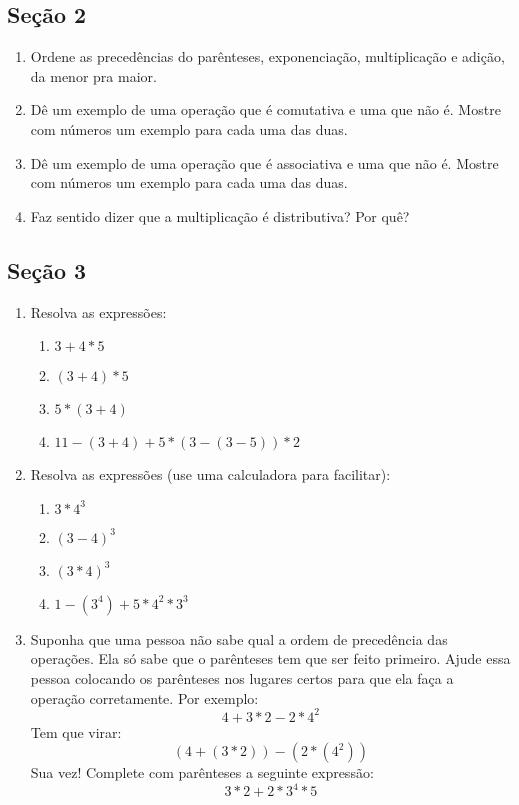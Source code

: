 \documentclass[12pt]{article}
\begin{document}
\subsection{Seção 2}
\begin{enumerate}
	\item Ordene as precedências do parênteses, exponenciação, multiplicação e 
adição, da menor pra maior.
	\item Dê um exemplo de uma operação que é comutativa e uma que não é. Mostre
com números um exemplo para cada uma das duas.
	\item Dê um exemplo de uma operação que é associativa e uma que não é. 
Mostre com números um exemplo para cada uma das duas.
	\item Faz sentido dizer que a multiplicação é distributiva? Por quê?
\end{enumerate}

\subsection{Seção 3}
\begin{enumerate}
	\item Resolva as expressões:
	\begin{enumerate}
		\item $3 + 4*5$
		\item $(3 + 4)*5$
		\item $5*(3 + 4)$
		\item $11 - (3 + 4) + 5*(3 - (3 - 5))*2$
	\end{enumerate}
	\item Resolva as expressões (use uma calculadora para facilitar):
	\begin{enumerate}
		\item $3 * 4^3$
		\item ${(3 - 4)}^3$
		\item ${(3 * 4)}^3$
		\item $1 - (3^4) + 5*4^2*3^3$
	\end{enumerate}
	\item Suponha que uma pessoa não sabe qual a ordem de precedência das
operações. Ela só sabe que o parênteses tem que ser feito primeiro.
Ajude essa pessoa colocando os parênteses nos lugares certos para que ela
faça a operação corretamente. Por exemplo:
$$4 + 3*2 - 2*4^2$$
Tem que virar:
$$(4 + (3*2)) - (2*(4^2))$$
Sua vez! Complete com parênteses a seguinte expressão:
$$3*2 + 2*3^4*5$$
\end{enumerate}
\end{document}
